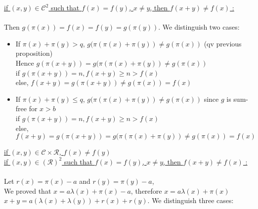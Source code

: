\underline{if \((x,y) \in \mathcal{C}^2\) such that \(f(x)=f(y)\), \(x \neq y\), then \(f(x+y)\neq f(x)\)  :}\\
\\Then  \(g(\pi(x))=f(x)=f(y)=g(\pi(y))\). We distinguish two cases:

\begin{itemize}
\item If \(\pi(x)+\pi(y)>q\), \(g(\pi(\pi(x)+\pi(y)) \neq g(\pi(x))\) (qv previous proposition)
\\Hence \(g(\pi(x+y))= g(\pi(\pi(x)+\pi(y))\neq g(\pi(x))\)
\\if \(g(\pi(x+y))=n, f(x+y)\geqslant n > f(x)\)
\\else, \(f(x+y)=g(\pi(x+y))\neq g(\pi(x))=f(x)\)
\item If  \(\pi(x)+\pi(y)\leqslant q\), \(g(\pi(\pi(x)+\pi(y)) \neq g(\pi(x))\) since \(g\) is sum-free for \(x>b\)
\\if \(g(\pi(x+y))=n, f(x+y)\geqslant n > f(x)\)
\\else, \(f(x+y)=g(\pi(x+y))=g(\pi(\pi(x)+\pi(y))\neq g(\pi(x))=f(x)\)


\end{itemize}



\underline{if \((x,y) \in \mathcal{C} \times \mathcal{R} \), \(f(x)\neq f(y)\)}\\

\underline{if \((x,y) \in (\mathcal{R})^2\) such that \(f(x)=f(y)\), \(x \neq y\), then \(f(x+y)\neq f(x)\)  :}\\
\\Let \(r(x)=\pi(x)-a\) and \(r(y)=\pi(y)-a\),
\\We proved that \(x=a\lambda(x)+\pi(x)-a\), therefore \(x=a\lambda(x)+\pi(x)\)
\\\(x+y=a(\lambda(x)+\lambda(y))+r(x)+r(y)\). We distinguish three cases:

